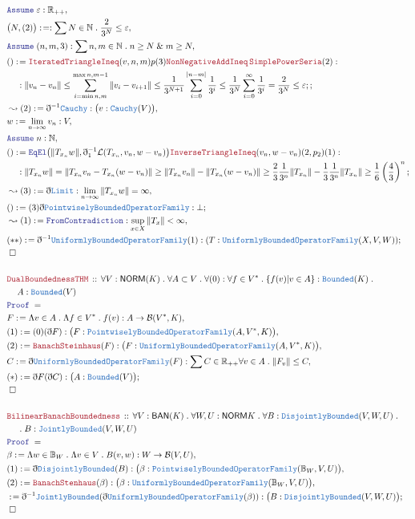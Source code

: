 \documentclass[12pt]{scrartcl}
\newcommand{\TYPE}[1]{\textcolor{NavyBlue}{\mathtt{#1}}}
\newcommand{\LOGIC}[1]{\textcolor{Blue}{\mathtt{#1}}}
\newcommand{\THM}[1]{\textcolor{Maroon}{\mathtt{#1}}}
\renewcommand{\.}{\; . \;}
\newcommand{\de}{: \kern 0.1pc =}
\newcommand{\Theorem}[2]{& \THM{#1} \, :: \, #2 \\ & \Proof = \\ }
\newcommand{\NewLine}{\\ & \kern 1pc}
\newcommand{\Page}[1]{\begin{align*} #1 \end{align*} \newpage   }
\newcommand{ \bd }{ \ByDef }
\renewcommand{\And}{\; \& \;}
\newcommand{\Reals}{\mathbb{R} }
\newcommand{\Nat}{\mathbb{N} }
\newcommand{\Say}[3]{& #1 \de #2 : #3, \\}
\newcommand{\Conclude}[3]{& #1 \de #2 : #3; \\}
\newcommand{\Derive}[3]{& \leadsto #1 \de #2 : #3, \\}
\newcommand{\A}{\LOGIC{Assume} \;}
\newcommand{\Assume}[2]{& \A #1 : #2, \\}
\newcommand{\QED}{\; \square}
\newcommand{\EndProof}{& \QED \\}
\newcommand{\ByDef}{\eth}
\newcommand{\Proof}{\LOGIC{Proof} \; }
\renewcommand{\L}{\mathcal{L}}
\newcommand{\NORM}{\textsf{NORM}}
\newcommand{\BAN}{\textsf{BAN}}
\newcommand{\B}{\mathcal{B}}
\begin{document}
\Page{
\Assume{\varepsilon}{\Reals_{++}}
\Say{\big(N,(2)\big)}{}{ \sum N \in \Nat \. \frac{2}{3^N} \le \varepsilon }
\Assume{(n,m,3)}{\sum n,m \in \Nat \. n \ge N \And m \ge N}
\Conclude{()}{ \THM{IteratedTriangleIneq}(v,n,m) p(3) \THM{NonNegativeAddIneq} \, \THM{SimplePowerSeria}(2)}
{ \NewLine : 
\| v_n - v_n\| \le \sum^{\max{n,m} - 1}_{i = \min{n,m}} \| v_i - v_{i + 1} \| \le 
 \frac{1}{3^{N + 1}}\sum^{|n - m|}_{i = 0} \frac{1}{3^i} \le 
 \frac{1}{3^N}\sum^{\infty}_{i = 0} \frac{1}{3^i} =  \frac{2}{3^N} \le \varepsilon ;
}
\Derive{(2)}{\bd^{-1} \TYPE{Cauchy}}{\big(v : \TYPE{Cauchy}(V) \big)}
\Say{w}{\lim_{n \to \infty} v_n}{V}
\Assume{n}{\Nat}
\Conclude{()}{ \LOGIC{EqEl}\big(\| T_{x_n} w \|,\bd_1^{-1} \L(T_{x_n}, v_n, w - v_n) \big) \THM{InverseTriangleIneq}(v_n, w - v_n)(2,p_2)(1)}
{ 
 \NewLine :
\| T_{x_n} w \| = \| T_{x_n} v_n  - T_{x_n}(w - v_n) \| \ge \|  T_{x_n} v_n \| -  \|T_{x_n}(w - v_n) \| \ge  \frac{2}{3}\frac{1}{3^n}\| T_{x_n} \| - \frac{1}{3}\frac{1}{3^n} \| T_{x_n} \| \ge 
\frac{1}{6} \left( \frac{4}{3} \right)^n
 }
\Derive{(3)}{\bd \TYPE{Limit}}{ \lim_{n \to \infty} \| T_{x_n} w \| = \infty}
\Conclude{()}{(3)\bd \TYPE{PointwiselyBoundedOperatorFamily}}{\bot}
\Derive{(1)}{\LOGIC{FromContradiction}}{\sup_{x \in X} \| T_x \| < \infty}
\Conclude{(**)}{\bd^{-1}\TYPE{UniformlyBoundedOperatorFamily}(1)}
{(T : \TYPE{UniformlyBoundedOperatorFamily}(X,V,W))}
\EndProof
\\
\Theorem{DualBoundednessTHM}{\forall V : \NORM(K) \.
\forall A \subset V \. \forall (0) : \forall f \in V^* \. \{ f(v) | v \in A  \}  : \TYPE{Bounded}(K) \.
\NewLine  A : \TYPE{Bounded}(V)
 }
\Say{F}{\Lambda v \in A \. \Lambda f \in V^* \. f(v)}{ A \to \B(V^*,K)}
\Say{(1)}{(0)(\bd F)}{\big( F : \TYPE{PointwiselyBoundedOperatorFamily}(A,V^*,K)  \big)}
\Say{(2)}{\THM{BanachSteinhaus}(F)}{\big( F : \TYPE{UniformlyBoundedOperatorFamily}(A,V^*,K) \big)}
\Say{C}{ \bd \TYPE{UniformlyBoundedOperatorFamily}(F)}{ \sum C \in  \Reals_{++} \forall v \in A \. 
 \| F_v \| \le C
}
\Conclude{(*)}{\bd F (\bd C)}{ \big(A : \TYPE{Bounded}(V) \big)}
\EndProof
\\
\Theorem{BilinearBanachBoundedness}
{\forall V : \BAN(K) \. \forall W, U : \NORM{K} \. \forall B : \TYPE{DisjointlyBounded}(V,W,U)
\. \NewLine \.  B : \TYPE{JointlyBounded}(V,W,U)
}
\Say{\beta}{\Lambda w \in \mathbb{B}_W \. \Lambda v \in V  \. B(v,w)}{W \to \B(V,U)}
\Say{(1)}{\bd \TYPE{DisjointlyBounded}(B)}{\big(\beta : \TYPE{PointwiselyBoundedOperatorFamily}(\mathbb{B}_W,V,U)\big)}
\Say{(2)}{\THM{BanachStenhaus}(\beta)}{\big(\beta : \TYPE{UniformlyBoundedOperatorFamily}(\mathbb{B}_W,V,U)\big)}
\Conclude{}{\bd^{-1} \TYPE{JointlyBounded}(\bd \TYPE{UniformlyBoundedOperatorFamily}(\beta))}{
 \big ( B : \TYPE{DisjointlyBounded}(V,W,U) \big)
}
\EndProof
}
\end{document}
